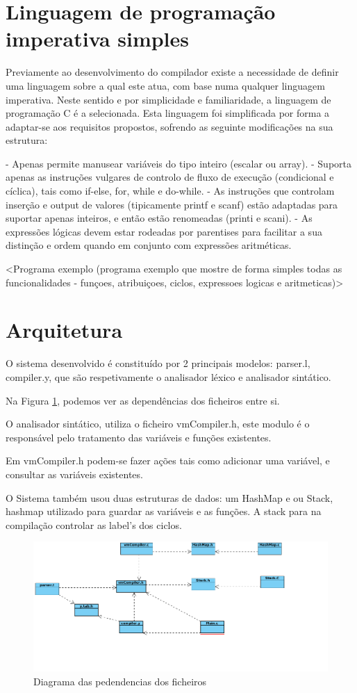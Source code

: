 \documentclass[a4paper,10pt]{report}
\begin{document}
\section{Linguagem de programação imperativa simples}
    Previamente ao desenvolvimento do compilador existe a necessidade de definir uma linguagem sobre a qual este atua, com base numa qualquer linguagem imperativa. Neste sentido e por simplicidade e familiaridade, a linguagem de programação C é a selecionada. Esta linguagem foi simplificada por forma a adaptar-se aos requisitos propostos, sofrendo as seguinte modificações na sua estrutura:

    - Apenas permite manusear variáveis do tipo inteiro (escalar ou array).
    - Suporta apenas as instruções vulgares de controlo de fluxo de execução (condicional e cíclica), tais como if-else, for, while e do-while.
    - As instruções que controlam inserção e output de valores (tipicamente printf e scanf) estão adaptadas para suportar apenas inteiros, e então estão renomeadas (printi e scani).
    - As expressões lógicas devem estar rodeadas por parentises para facilitar a sua distinção e ordem quando em conjunto com expressões aritméticas. 


    <Programa exemplo (programa exemplo que mostre de forma simples todas as funcionalidades - funçoes, atribuiçoes, ciclos, expressoes logicas e aritmeticas)> 

\section{Arquitetura}
    O sistema desenvolvido é constituído por 2 principais modelos:  parser.l, compiler.y, que são respetivamente o analisador léxico e analisador sintático. 

    Na Figura \ref{fig:dependencias}, podemos ver as dependências dos ficheiros entre si.

    O analisador sintático, utiliza o ficheiro vmCompiler.h, este modulo é o responsável pelo tratamento das variáveis e funções existentes.

    Em vmCompiler.h podem-se fazer ações tais como adicionar uma variável, e consultar as variáveis existentes.

    O Sistema também usou duas estruturas de dados: um HashMap e ou Stack, hashmap utilizado para guardar as variáveis e as funções. A stack para na compilação controlar as label's dos ciclos.

\begin{figure}
\centering
\includegraphics[width=15cm]{imagens/dependecias.png}
\caption{Diagrama das pedendencias dos ficheiros}
\label{fig:dependencias}
\end{figure}
\end{document}
